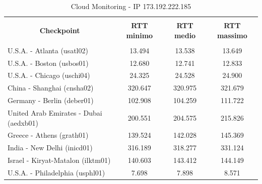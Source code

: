 \documentclass[a4paper,11pt]{book}
\begin{document}
\begin{table}[!ht]
\caption{Cloud Monitoring - IP 173.192.222.185}\label{table:Monitoring_2}
\begin{tabular}{|l|c|c|c|}
\hline
\multicolumn{1}{|c|}{\textbf{}} & {\textbf{}} & {\textbf{}} & {\textbf{}}\\
\multicolumn{1}{|c|}{\textbf{Checkpoint}} & {\textbf{RTT minimo}} & {\textbf{RTT medio}} & {\textbf{RTT massimo}}\\
\multicolumn{1}{|c|}{\textbf{}} & {\textbf{}} & {\textbf{}} & {\textbf{}}\\
\hline
U.S.A. - Atlanta (usatl02) & 13.494 & 13.538 & 13.649\\
U.S.A. - Boston (usbos01) & 12.680 & 12.741 & 12.833\\
U.S.A. - Chicago (uschi04) & 24.325 & 24.528 & 24.900\\
China - Shanghai (cnsha02) & 320.647 & 320.975 & 321.679\\
Germany - Berlin (deber01) & 102.908 & 104.259 & 111.722\\
United Arab Emirates - Dubai (aedxb01) & 200.551 & 204.575 & 215.826\\
Greece - Athens (grath01) & 139.524 & 142.028 & 145.369\\
India - New Delhi (inicd01) & 316.189 & 318.277 & 331.124\\
Israel - Kiryat-Matalon (ilktm01) & 140.603 & 143.412 & 144.149\\
U.S.A. - Philadelphia (usphl01) & 7.698 & 7.898 & 8.571\\
\hline
\end{tabular}
\end{table}

~
\end{document}
